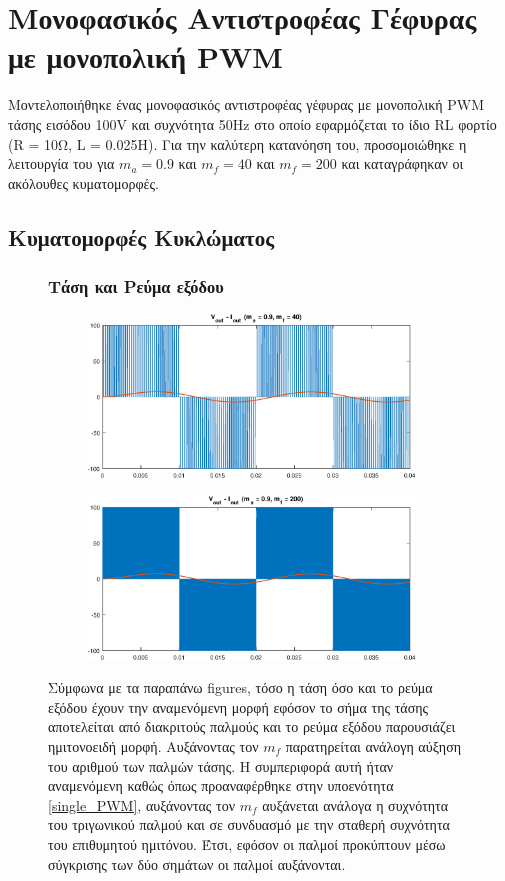 \section{Μονοφασικός Αντιστροφέας Γέφυρας με μονοπολική PWM}
Μοντελοποιήθηκε ένας μονοφασικός αντιστροφέας γέφυρας με μονοπολική PWM τάσης εισόδου 100V και συχνότητα 50Hz στο οποίο εφαρμόζεται το ίδιο RL φορτίο (R = 10Ω, L = 0.025Η). Για την καλύτερη κατανόηση του, προσομοιώθηκε η λειτουργία του για $m_a = 0.9$ και $m_f = 40$  και $m_f = 200$ και καταγράφηκαν οι ακόλουθες κυματομορφές.

\subsection{Κυματομορφές Κυκλώματος}

\begin{figure}[h!]
	\subsubsection*{Τάση και Ρεύμα εξόδου}
	\begin{subfigure}{0.49\textwidth}
		\centering
		\includegraphics[width=0.95\textwidth]{Images/V_out_I_out_40}
	\end{subfigure}
	\begin{subfigure}{0.49\textwidth}
		\centering
		\includegraphics[width=0.95\textwidth]{Images/V_out_I_out_200}
	\end{subfigure}
	\noindent
	Σύμφωνα με τα παραπάνω figures, τόσο η τάση όσο και το ρεύμα εξόδου έχουν την αναμενόμενη μορφή εφόσον το σήμα της τάσης αποτελείται από διακριτούς παλμούς και το ρεύμα εξόδου παρουσιάζει ημιτονοειδή μορφή. Αυξάνοντας τον $m_f$ παρατηρείται ανάλογη αύξηση του αριθμού των παλμών τάσης.  Η συμπεριφορά  αυτή ήταν αναμενόμενη καθώς όπως προαναφέρθηκε στην υποενότητα \ref{single_PWM}, αυξάνοντας τον $m_f$ αυξάνεται ανάλογα η συχνότητα του τριγωνικού παλμού και σε συνδυασμό με την σταθερή συχνότητα του επιθυμητού ημιτόνου. Έτσι, εφόσον οι παλμοί προκύπτουν μέσω σύγκρισης των δύο σημάτων οι παλμοί αυξάνονται.

\end{figure}
